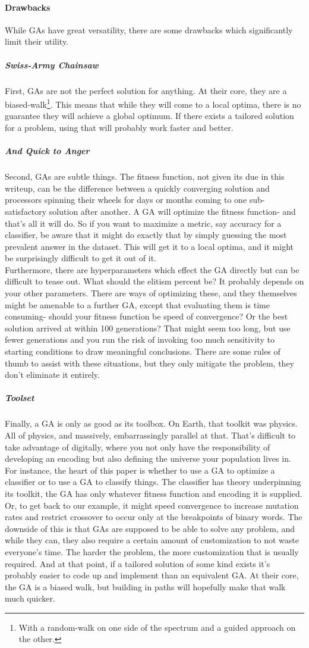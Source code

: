 \paragraph{Drawbacks}
While GAs have great versatility, there are some drawbacks which significantly limit their utility.
\subparagraph{Swiss-Army Chainsaw}
First, GAs are not the perfect solution for anything.  At their core, they are a biased-walk\footnote{With a random-walk on one side of the spectrum and a guided approach on the other.}.  This means that while they will come to a local optima, there is no guarantee they will achieve a global optimum.  If there exists a tailored solution for a problem, using that will probably work faster and better.
\subparagraph{And Quick to Anger}
Second, GAs are subtle things.  The fitness function, not given its due in this writeup, can be the difference between a quickly converging solution and processors spinning their wheels for days or months coming to one sub-satisfactory solution after another.  A GA will optimize the fitness function- and that's all it will do.  So if you want to maximize a metric, say accuracy for a classifier, be aware that it might do exactly that by simply guessing the most prevalent answer in the dataset.  This will get it to a local optima, and it might be surprisingly difficult to get it out of it.\\
Furthermore, there are hyperparameters which effect the GA directly but can be difficult to tease out.  What should the elitism percent be?  It probably depends on your other parameters.  There are ways of optimizing these, and they themselves might be amenable to a further GA, except that evaluating them is time consuming- should your fitness function be speed of convergence?  Or the best solution arrived at within 100 generations?  That might seem too long, but use fewer generations and you run the risk of invoking too much sensitivity to starting conditions to draw meaningful conclusions.  There are some rules of thumb to assist with these situations, but they only mitigate the problem, they don't eliminate it entirely.
\subparagraph{Toolset}
Finally, a GA is only as good as its toolbox.  On Earth, that toolkit was physics.  All of physics, and massively, embarrassingly parallel at that.  That's difficult to take advantage of digitally, where you not only have the responsibility of developing an encoding but also defining the universe your population lives in.  For instance, the heart of this paper is whether to use a GA to optimize a classifier or to use a GA to classify things.  The classifier has theory underpinning its toolkit, the GA has only whatever fitness function and encoding it is supplied.  Or, to get back to our example, it might speed convergence to increase mutation rates and restrict crossover to occur only at the breakpoints of binary words.  The downside of this is that GAs are supposed to be able to solve any problem, and while they can, they also require a certain amount of customization to not waste everyone's time.  The harder the problem, the more customization that is usually required.  And at that point, if a tailored solution of some kind exists it's probably easier to code up and implement than an equivalent GA.  At their core, the GA is a biased walk, but building in paths will hopefully make that walk much quicker.
